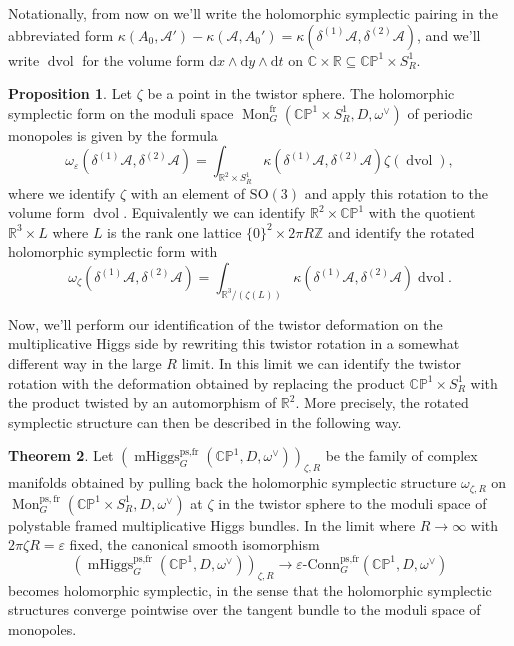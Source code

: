 \documentclass[11pt, oneside, reqno]{amsart}
\theoremstyle{definition} \newtheorem{definition}{Definition}[section]
\newtheorem{theorem}[definition]{Theorem}
\newtheorem{prop}[definition]{Proposition}
\theoremstyle{definition} \newtheorem{remark}[definition]{Remark}
\theoremstyle{definition} \newtheorem{remarks}[definition]{Remarks}
\theoremstyle{definition} \newtheorem{question}[definition]{Question}
\theoremstyle{definition} \newtheorem*{note}{Note}
\theoremstyle{definition} \newtheorem{example}[definition]{Example}
\theoremstyle{definition} \newtheorem{examples}[definition]{Examples}
\newcommand{\bb}[1]{\mathbb{#1}}
\newcommand{\mr}[1]{\mathrm{#1}}
\newcommand{\mc}[1]{\mathcal{#1}}
\newcommand{\CC}{\mathbb{C}}
\newcommand{\RR}{\mathbb{R}}
\newcommand{\ZZ}{\mathbb{Z}}
\newcommand{\eps}{\varepsilon}
\newcommand{\SO}{\mathrm{SO}}
\newcommand{\sub}{\subseteq}
\DeclareMathOperator{\dvol}{dvol}
\DeclareMathOperator{\mhiggs}{mHiggs}
\DeclareMathOperator{\mon}{Mon}
\newcommand{\epsconn}{\varepsilon\text{-Conn}}
\renewcommand{\d}{\mathrm{d}}
\newcommand{\fr}{\mathrm{fr}}
\begin{document}
Notationally, from now on we'll write the holomorphic symplectic pairing in the abbreviated form $\kappa(A_0, \mc A') - \kappa(\mc A, A_0') = \kappa(\delta^{(1)} \mc A, \delta^{(2)} \mc A)$, and we'll write $\dvol$ for the volume form $\d x \wedge \d y \wedge \d t$ on $\CC \times \RR \sub \bb{CP}^1 \times S^1_R$.

\begin{prop}
Let $\zeta$ be a point in the twistor sphere.  The holomorphic symplectic form on the moduli space $\mon_G^{\fr}(\bb{CP}^1 \times S^1_R, D, \omega^\vee)$ of periodic monopoles is given by the formula 
\[\omega_\eps(\delta^{(1)}\mc A, \delta^{(2)}\mc A) = \int_{\RR^2 \times S^1_R} \kappa(\delta^{(1)} \mc A, \delta^{(2)} \mc A) \zeta(\dvol),\]
where we identify $\zeta$ with an element of $\SO(3)$ and apply this rotation to the volume form $\dvol$.  Equivalently we can identify $\RR^2 \times \bb{CP}^1$ with the quotient $\RR^3 \times L$ where $L$ is the rank one lattice $\{0\}^2 \times 2\pi R\ZZ$ and identify the rotated holomorphic symplectic form with 
\[\omega_\zeta(\delta^{(1)}\mc A, \delta^{(2)}\mc A) = \int_{\RR^3/(\zeta(L))} \kappa(\delta^{(1)} \mc A, \delta^{(2)} \mc A) \dvol.\]
\end{prop}

Now, we'll perform our identification of the twistor deformation on the multiplicative Higgs side by rewriting this twistor rotation in a somewhat different way in the large $R$ limit.  In this limit we can identify the twistor rotation with the deformation obtained by replacing the product $\bb{CP}^1 \times S^1_R$ with the product twisted by an automorphism of $\RR^2$.  More precisely, the rotated symplectic structure can then be described in the following way.

\begin{theorem} \label{HK_rotation_thm}
Let $\left(\mhiggs^{\text{ps,fr}}_G(\bb{CP}^1,D,\omega^\vee)\right)_{\zeta,R}$ be the family of complex manifolds obtained by pulling back the holomorphic symplectic structure $\omega_{\zeta,R}$ on $\mon_G^{\mr{ps},\fr}(\bb{CP}^1 \times S^1_R,D,\omega^\vee)$ at $\zeta$ in the twistor sphere to the moduli space of polystable framed multiplicative Higgs bundles.  In the limit where $R \to \infty$ with $2 \pi \zeta R = \eps$ fixed, the canonical smooth isomorphism
\[\left(\mhiggs^{\text{ps,fr}}_G(\bb{CP}^1,D,\omega^\vee)\right)_{\zeta,R} \to \epsconn^{\text{ps,fr}}_G(\bb{CP}^1,D,\omega^\vee)\]
becomes holomorphic symplectic, in the sense that the holomorphic symplectic structures converge pointwise over the tangent bundle to the moduli space of monopoles. 
\end{theorem}
\end{document}
